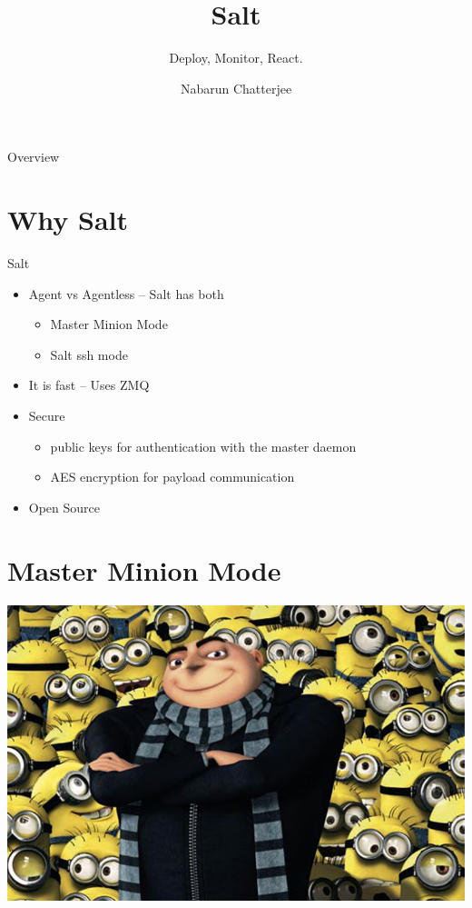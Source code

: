 \documentclass[pdf]{beamer}
\title{Salt}
\subtitle{Deploy, Monitor, React.}
\author{Nabarun Chatterjee}
\begin{document}
	\begin{frame}
		\titlepage
	\end{frame}

	\begin{frame}{Overview}
		\tableofcontents
	\end{frame}

	\section{Why Salt}
	\begin{frame}{Salt}
		\begin{itemize}
			\item Agent vs Agentless
			\pause
			--  Salt has both
			\begin{itemize}
				\pause
				\item Master Minion Mode
				\pause
				\item Salt ssh mode
			\end{itemize}
			\pause
			\item It is fast
			\pause
			-- Uses ZMQ
			\pause
			\item Secure
			\begin{itemize}
				\pause
				\item public keys for authentication with the master daemon
				\pause
				\item AES encryption for payload communication
			\end{itemize}
			\pause
			\item Open Source
		\end{itemize}
	\end{frame}
	\section{Master Minion Mode}
	\begin{frame}
		\includegraphics[scale=0.4]{gru.jpg}
	\end{frame}
\end{document}
